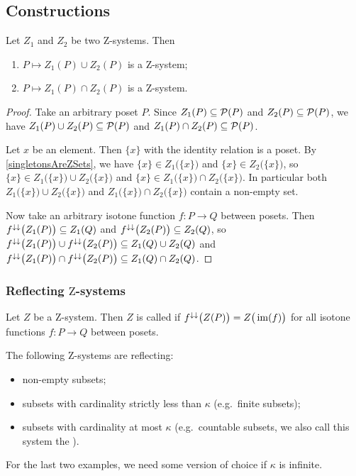 \subsection{Constructions}
\begin{lemma} \label{unionIntersectionZsystems}
Let $Z_1$ and $Z_2$ be two $\mathrm{Z}$-systems. Then
\begin{enumerate}
\item $P\mapsto Z_1(P) \cup Z_2(P)$ is a $\mathrm{Z}$-system;
\item $P\mapsto Z_1(P) \cap Z_2(P)$ is a $\mathrm{Z}$-system.
\end{enumerate}
\end{lemma}
\begin{proof}
Take an arbitrary poset $P$. Since $Z_1(P) \subseteq \operatorname{\mathcal{P}}(P)$ and $Z_2(P) \subseteq \operatorname{\mathcal{P}}(P)$, we have $Z_1(P)\cup Z_2(P) \subseteq \operatorname{\mathcal{P}}(P)$ and $Z_1(P)\cap Z_2(P) \subseteq \operatorname{\mathcal{P}}(P)$.

Let $x$ be an element. Then $\{x\}$ with the identity relation is a poset. By \ref{singletonsAreZSets}, we have $\{x\} \in Z_1\big(\{x\}\big)$ and $\{x\} \in Z_2\big(\{x\}\big)$, so $\{x\} \in Z_1\big(\{x\}\big) \cup Z_2\big(\{x\}\big)$ and $\{x\} \in Z_1\big(\{x\}\big) \cap Z_2\big(\{x\}\big)$. In particular both $Z_1\big(\{x\}\big) \cup Z_2\big(\{x\}\big)$ and $Z_1\big(\{x\}\big) \cap Z_2\big(\{x\}\big)$ contain a non-empty set.

Now take an arbitrary isotone function $f:P\to Q$ between posets. Then $f^{\downarrow\downarrow}\big(Z_1(P)\big) \subseteq Z_1(Q)$ and $f^{\downarrow\downarrow}\big(Z_2(P)\big) \subseteq Z_2(Q)$, so $f^{\downarrow\downarrow}\big(Z_1(P)\big) \cup f^{\downarrow\downarrow}\big(Z_2(P)\big) \subseteq Z_1(Q)\cup Z_2(Q)$ and $f^{\downarrow\downarrow}\big(Z_1(P)\big) \cap f^{\downarrow\downarrow}\big(Z_2(P)\big) \subseteq Z_1(Q)\cap Z_2(Q)$.
\end{proof}

\subsubsection{Reflecting $\mathrm{Z}$-systems}
\begin{definition}
Let $Z$ be a $\mathrm{Z}$-system. Then $Z$ is called  if $f^{\downarrow\downarrow}\big(Z(P)\big) = Z\big(\operatorname{im}(f)\big)$ for all isotone functions $f: P\to Q$ between posets.
\end{definition}

\begin{example}
The following $\mathrm{Z}$-systems are reflecting:
\begin{itemize}
\item non-empty subsets;
\item subsets with cardinality strictly less than $\kappa$ (e.g.\ finite subsets);
\item subsets with cardinality at most $\kappa$ (e.g.\ countable subsets, we also call this system the ).
\end{itemize}
For the last two examples, we need some version of choice if $\kappa$ is infinite.
\end{example}

